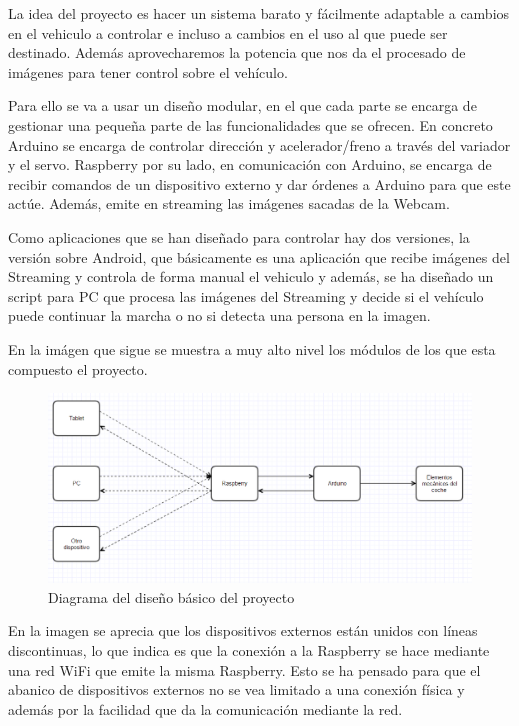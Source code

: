 \documentclass{pclass}
\begin{document}
La idea del proyecto es hacer un sistema barato y fácilmente adaptable a cambios en el vehiculo a controlar e incluso a cambios en el uso al que puede ser destinado. Además aprovecharemos la potencia que nos da el procesado de imágenes para tener control sobre el vehículo.

Para ello se va a usar un diseño modular, en el que cada parte se encarga de gestionar una pequeña parte de las funcionalidades que se ofrecen. En concreto Arduino se encarga de controlar dirección y acelerador/freno a través del variador y el servo. Raspberry por su lado, en comunicación con Arduino, se encarga de recibir comandos de un dispositivo externo y dar órdenes a Arduino para que este actúe. Además, emite en streaming las imágenes sacadas de la Webcam. 

Como aplicaciones que se han diseñado para controlar hay dos versiones, la versión sobre Android, que básicamente es una aplicación que recibe imágenes del Streaming y controla de forma manual el vehiculo y además, se ha diseñado un script para PC que procesa las imágenes del Streaming y decide si el vehículo puede continuar la marcha o no si detecta una persona en la imagen.

En la imágen que sigue se muestra a muy alto nivel los módulos de los que esta compuesto el proyecto.

	\begin{figure}[H]
		\centering
		\includegraphics[width=1\textwidth]{img/diseno}
		\caption{Diagrama del diseño básico del proyecto}
		\label{fig:diseno}
	\end{figure}

En la imagen se aprecia que los dispositivos externos están unidos con líneas discontinuas, lo que indica es que la conexión a la Raspberry se hace mediante una red WiFi que emite la misma Raspberry. Esto se ha pensado para que el abanico de dispositivos externos no se vea limitado a una conexión física y además por la facilidad que da la comunicación mediante la red.
\end{document}

